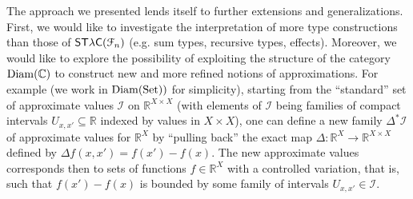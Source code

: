%
%
%
%
%
%
%
%
%

The approach we presented lends itself to further extensions and generalizations.
First, we would like to investigate the interpretation of more type constructions than those of $\mathsf{ST\lambda C}(\mathcal F_{n})$ (e.g. sum types, recursive types, effects). Moreover, we would like to explore the possibility of exploiting the structure of the category $\operatorname{Diam}(\mathbb C)$ to construct new and more refined notions of approximations.
For example (we work in $\operatorname{Diam}(\operatorname{Set}))$ for simplicity), 
starting from the ``standard'' set of approximate values $\mathcal I$ on $\mathbb{R}^{X\times X}$ (with elements of $\mathcal I$ being  families of compact intervals $U_{x,x'}\subseteq \mathbb R$ indexed by values in $X\times X$), one can define a new family  $\Delta^{*}\mathcal I$  of approximate values for  $\mathbb R^{X}$ by ``pulling back'' the exact map 
$\Delta:
\mathbb R^{X} \to \mathbb R^{X\times X}$ defined by $\Delta f(x,x')=f(x')-f(x)$. 
The new approximate values corresponds then to sets of functions $f\in \mathbb R^{X}$ with a controlled variation, that is, such that $f(x')-f(x)$ is bounded by some family of intervals $U_{x,x'} \in \mathcal I$.





